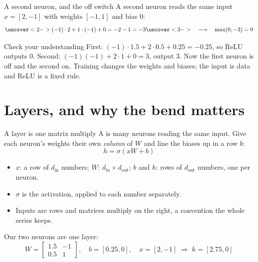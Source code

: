 \documentclass[aspectratio=169,11pt,t,\primeropts]{beamer}
\begin{document}
\begin{frame}{A second neuron, and the off switch}
  A second neuron reads the same input $x = [2, -1]$ with weights $[-1, 1]$ and bias $0$:
  \[
    \uncover<2->{(-1)\cdot 2 + 1\cdot(-1) + 0 = -2 - 1 = -3}
    \uncover<3->{\quad\longrightarrow\quad \max(0, -3) = 0}
  \]
  \vspace{4mm}
\end{frame}

\begin{frame}{Check your understanding}
  {First: $(-1) \cdot 1.5 + 2 \cdot 0.5 + 0.25 = -0.25$, so ReLU outputs $0$. Second:
    $(-1)(-1) + 2 \cdot 1 + 0 = 3$, output $3$. Now the first neuron is off and the second on.
    Training changes the weights and biases; the input is data and ReLU is a fixed rule.}
\end{frame}

\section{Layers, and why the bend matters}

\begin{frame}{A layer is one matrix multiply}
  A  is many neurons reading the same input. Give each neuron's weights their own
  \emph{column} of $W$ and line the biases up in a row $b$:
  \[ h = \sigma(xW + b) \]
  \begin{itemize}
    \item $x$: a row of $d_{\text{in}}$ numbers; $W$: $d_{\text{in}} \times d_{\text{out}}$;
      $b$ and $h$: rows of $d_{\text{out}}$ numbers, one per neuron.
    \item $\sigma$ is the activation, applied to each number separately.
    \item Inputs are rows and matrices multiply on the right, a convention the whole series keeps.
  \end{itemize}
  \pause
  Our two neurons are one layer:
  \[
    W = \begin{bmatrix} 1.5 & -1 \\ 0.5 & 1 \end{bmatrix},\quad b = [0.25, 0],\quad
    x = [2, -1] \;\Rightarrow\; h = [2.75, 0]
  \]

\end{frame}
\end{document}

